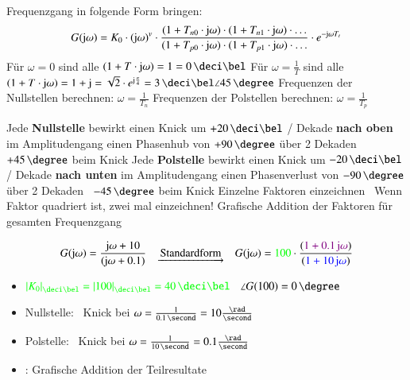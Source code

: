 \begin{outline}
    \1 Frequenzgang in folgende Form bringen:
        $$ G(\mathrm{j} \omega) = K_0 \cdot (\mathrm{j} \omega)^v \cdot \frac{(1 + T_{n0} \cdot \mathrm{j} \omega)\cdot (1 + T_{n1} \cdot \mathrm{j} \omega) \cdot \ldots}
        {(1 + T_{p0} \cdot \mathrm{j} \omega)\cdot (1 + T_{p1} \cdot \mathrm{j} \omega) \cdot \ldots} \cdot e^{- \mathrm{j} \omega T_t} $$
        \2 Für $\omega = 0$ sind alle $(1 + T \cdot \jimg \omega) = 1 = 0 \, \deci \bel$
        \2 Für $\omega = \frac{1}{T}$ sind alle  $(1 + T \cdot \jimg \omega) = 1 + \jimg = \sqrt{2} \cdot e^{\jimg \frac{\pi}{4}} 
            = 3 \, \deci \bel \angle 45 \, \degree$
    \1 Frequenzen der Nullstellen berechnen: $\omega = \frac{1}{T_n}$
    \1 Frequenzen der Polstellen berechnen: $\omega = \frac{1}{T_p}$


    \1 Jede \textbf{Nullstelle} bewirkt
        \2 einen Knick um $+ 20 \, \deci \bel$ / Dekade \textbf{nach oben} im Amplitudengang
        \2 einen Phasenhub von $+ 90 \, \degree$ über 2 Dekaden \textrightarrow\ $+ 45 \, \degree$ beim Knick
    \1 Jede \textbf{Polstelle} bewirkt
        \2 einen Knick um $- 20 \, \deci \bel$ / Dekade \textbf{nach unten} im Amplitudengang
        \2 einen Phasenverlust von $- 90 \, \degree$ über 2 Dekaden \textrightarrow\ $- 45 \, \degree$ beim Knick
    \1 Einzelne Faktoren einzeichnen \textrightarrow\ Wenn Faktor quadriert ist, zwei mal einzeichnen!
    \1 Grafische Addition der Faktoren für gesamten Frequenzgang
\end{outline}


\vspace{-0.2cm}
$$ G(\mathrm{j} \omega) = \frac{\mathrm{j} \omega + 10}{(\mathrm{j} \omega + 0.1)} \quad  \underrightarrow{\text{ Standardform }} \quad 
  G(\mathrm{j} \omega) = {\color{green}100} \cdot \frac{({\color{violet}1 + 0.1 \, \mathrm{j} \omega})}{({\color{blue} 1 + 10 \, \mathrm{j} \omega})} $$

  \begin{itemize}
    \item $ \cgn{\abs{K_0}_{\deci \bel} = \abs{100}_{\deci \bel} = 40 \, \deci \bel}$ \textrightarrow\ $\angle G(100) = 0 \, \degree$
    \item Nullstelle:  \textrightarrow\ Knick bei $\omega = \frac{1}{0.1 \, \second} = 10 \frac{\rad}{\second}$
    \item Polstelle:  \textrightarrow\ Knick bei $\omega = \frac{1}{10 \, \second} = 0.1 \frac{\rad}{\second}$
    \item {}: Grafische Addition der Teilresultate
  \end{itemize}

